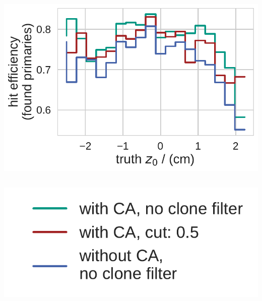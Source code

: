 \documentclass[18pt, aspectratio=169]{beamer}
\begin{document}
\begin{frame}
\begin{columns}
\begin{column}{.5\textwidth}
      \includegraphics[width=.60\textwidth]{figures/hiteff_on_matched_by_z0_truth_fullreco_trainedWithFakes.pdf}
    \end{column}
  \end{columns}
  \begin{center}
    \includegraphics[width=.2\textwidth]{figures/legend_fom_profile.pdf}
  \end{center}
\end{frame}
\end{document}

